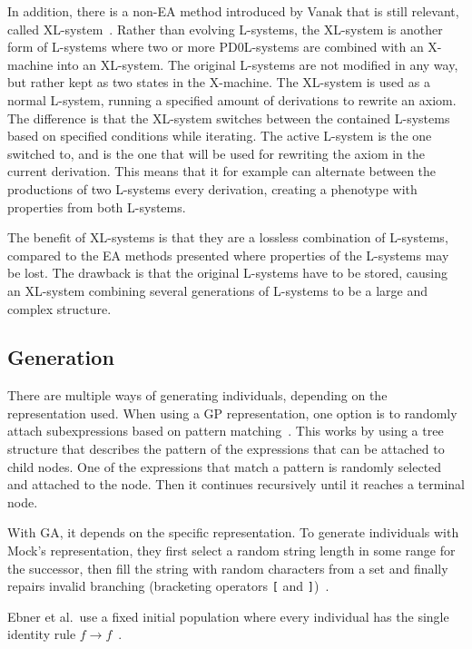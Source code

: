 In addition, there is a non-\gls{EA} method introduced by Vanak that is still relevant, called XL-system~\cite{2000Vanak}.
Rather than evolving \glspl{L-system}, the XL-system is another form of \glspl{L-system} where two or more PD0L-systems are combined with an X-machine into an XL-system.
The original \glspl{L-system} are not modified in any way, but rather kept as two states in the X-machine.
The XL-system is used as a normal \gls{L-system}, running a specified amount of derivations to rewrite an axiom.
The difference is that the XL-system switches between the contained \glspl{L-system} based on specified conditions while iterating.
The active \gls{L-system} is the one switched to, and is the one that will be used for rewriting the axiom in the current derivation.
This means that it for example can alternate between the productions of two \glspl{L-system} every derivation, creating a phenotype with properties from both \glspl{L-system}.

The benefit of XL-systems is that they are a lossless combination of \glspl{L-system}, compared to the \gls{EA} methods presented where properties of the \glspl{L-system} may be lost.
The drawback is that the original \glspl{L-system} have to be stored, causing an XL-system combining several generations of \glspl{L-system} to be a large and complex structure.

\subsection{Generation}
There are multiple ways of generating individuals, depending on the representation used.
When using a \gls{GP} representation, one option is to randomly attach subexpressions based on pattern matching~\cite{1994Jacob}.
This works by using a tree structure that describes the pattern of the expressions that can be attached to child nodes. One of the expressions that match a pattern is randomly selected and attached to the node. Then it continues recursively until it reaches a terminal node.

With \gls{GA}, it depends on the specific representation.
To generate individuals with Mock's representation, they first select a random string length in some range for the successor, then fill the string with random characters from a set and finally repairs invalid branching (bracketing operators \texttt{[} and \texttt{]})~\cite{1998Mock}.

Ebner et al.\ use a fixed initial population where every individual has the single identity rule $f\rightarrow f$~\cite{2002Ebner}.


